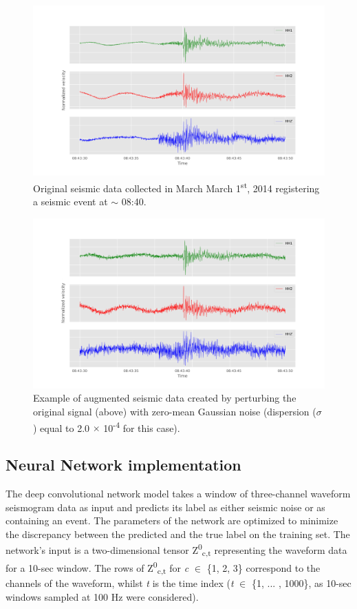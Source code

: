 \documentclass{article}
\begin{document}
\begin{figure}[h!]
    \centering
    \includegraphics[width=0.9\linewidth,height=0.4\linewidth]{images/three_channel.png}
    \caption{Original seismic data collected in March March 1\textsuperscript{st}, 2014 registering a seismic event at $\sim$ 08:40.}
    \label{fig:orig_data}
\end{figure}


\begin{figure}[h!]
    \centering
    \includegraphics[width=0.9\linewidth,height=0.4\linewidth]{images/three_channel_noise.png}
    \caption{Example of augmented seismic data created by perturbing the original signal (above) with zero-mean Gaussian noise (dispersion ($\sigma$) equal to 2.0 $\times$ 10\textsuperscript{-4} for this case).}
    \label{fig:aug_data}
\end{figure}


\subsection{Neural Network implementation}

The deep convolutional network model takes a window of three-channel waveform seismogram data as input and predicts its label as either seismic noise or as containing an event. The parameters of the network are optimized to minimize the discrepancy between the predicted and the true label on the training set. The network's input is a two-dimensional tensor Z\textsuperscript{0}\textsubscript{c,t} representing the waveform data for a 10-sec window. The rows of Z\textsuperscript{0}\textsubscript{c,t} for \textit{c} $\in$ \{1, 2, 3\} correspond to the channels of the waveform, whilst \textit{t} is the time index (\textit{t} $\in$ \{1, ... , 1000\}, as 10-sec windows sampled at 100 Hz were considered).
\end{document}
